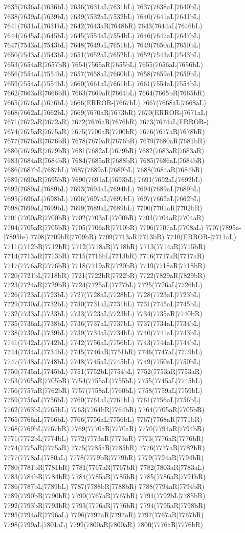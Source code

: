 7635(7636aL|7636bL) 7636(7631aL|7631bL) 7637(7638aL|7640bL) 7638(7639aL|7639bL) 7639(7532aL|7532bL) 7640(7641aL|7641bL) 7641(7631aL|7631bL) 7642(7643aR|7648bR) 7643(7644aL|7646bL) 7644(7645aL|7645bL) 7645(7554aL|7554bL) 7646(7647aL|7647bL) 7647(7543aL|7543bL) 7648(7649aL|7651bL) 7649(7650aL|7650bL) 7650(7543aL|7543bL) 7651(7652aL|7652bL) 7652(7543aL|7543bL) 7653(7654aR|7657bR) 7654(7565aR|7655bL) 7655(7656aL|7656bL) 7656(7554aL|7554bL) 7657(7658aL|7660bL) 7658(7659aL|7659bL) 7659(7554aL|7554bL) 7660(7661aL|7661bL) 7661(7554aL|7554bL) 7662(7663aR|7666bR) 7663(7669aR|7664bL) 7664(7665bR|7665bR) 7665(7676aL|7676bL) 7666(ERROR-|7667bL) 7667(7668aL|7668aL) 7668(7662aL|7662bL) 7669(7670aR|7673bR) 7670(ERROR-|7671aL) 7671(7672aR|7672aR) 7672(7676aR|7676bR) 7673(7674aL|ERROR-) 7674(7675aR|7675aR) 7675(7700aR|7700bR) 7676(7677aR|7678bR) 7677(7676aR|7676bR) 7678(7679aR|7676bR) 7679(7680aR|7681bR) 7680(7679aR|7679bR) 7681(7682aL|7679bR) 7682(7683aR|7683aR) 7683(7684aR|7684bR) 7684(7685aR|7688bR) 7685(7686aL|7684bR) 7686(7687bL|7687bL) 7687(7689aL|7689bL) 7688(7684aR|7684bR) 7689(7690aR|7695bR) 7690(7691aL|7693bL) 7691(7692aL|7692bL) 7692(7689aL|7689bL) 7693(7694aL|7694bL) 7694(7689aL|7689bL) 7695(7696aL|7698bL) 7696(7697aL|7697bL) 7697(7662aL|7662bL) 7698(7699aL|7699bL) 7699(7689aL|7689bL) 7700(7701aR|7702bR) 7701(7700aR|7700bR) 7702(7703aL|7700bR) 7703(7704aR|7704aR) 7704(7705aR|7705bR) 7705(7706aR|7710bR) 7706(7707aL|7708aL) 7707(7895a-|7895b-) 7708(7709bR|7709bR) 7709(7713aR|7713bR) 7710(ERROR-|7711aL) 7711(7712bR|7712bR) 7712(7718aR|7718bR) 7713(7714aR|7715bR) 7714(7713aR|7713bR) 7715(7716bL|7713bR) 7716(7717aR|7717aR) 7717(7776aR|7776bR) 7718(7719aR|7720bR) 7719(7718aR|7718bR) 7720(7721bL|7718bR) 7721(7722bR|7722bR) 7722(7829aR|7829bR) 7723(7724aR|7729bR) 7724(7725aL|7727bL) 7725(7726aL|7726bL) 7726(7723aL|7723bL) 7727(7728aL|7728bL) 7728(7723aL|7723bL) 7729(7730aL|7732bL) 7730(7731aL|7731bL) 7731(7745aL|7745bL) 7732(7733aL|7733bL) 7733(7723aL|7723bL) 7734(7735aR|7740bR) 7735(7736aL|7738bL) 7736(7737aL|7737bL) 7737(7734aL|7734bL) 7738(7739aL|7739bL) 7739(7734aL|7734bL) 7740(7741aL|7743bL) 7741(7742aL|7742bL) 7742(7756aL|7756bL) 7743(7744aL|7744bL) 7744(7734aL|7734bL) 7745(7746aR|7751bR) 7746(7747aL|7749bL) 7747(7748aL|7748bL) 7748(7745aL|7745bL) 7749(7750aL|7750bL) 7750(7745aL|7745bL) 7751(7752bL|7754bL) 7752(7753aR|7753aR) 7753(7705aR|7705bR) 7754(7755aL|7755bL) 7755(7745aL|7745bL) 7756(7757aR|7762bR) 7757(7758aL|7760bL) 7758(7759aL|7759bL) 7759(7756aL|7756bL) 7760(7761aL|7761bL) 7761(7756aL|7756bL) 7762(7763bL|7765bL) 7763(7764bR|7764bR) 7764(7705aR|7705bR) 7765(7766aL|7766bL) 7766(7756aL|7756bL) 7767(7768aR|7771bR) 7768(7769bL|7767bR) 7769(7770aR|7770aR) 7770(7794aR|7794bR) 7771(7772bL|7774bL) 7772(7773aR|7773aR) 7773(7776aR|7776bR) 7774(7775aR|7775aR) 7775(7785aR|7785bR) 7776(7777aR|7782bR) 7777(7778aL|7780aL) 7778(7779bR|7779bR) 7779(7794aR|7794bR) 7780(7781bR|7781bR) 7781(7767aR|7767bR) 7782(7803aR|7783aL) 7783(7784bR|7784bR) 7784(7785aR|7785bR) 7785(7786aR|7791bR) 7786(7787bL|7789bL) 7787(7788bR|7788bR) 7788(7794aR|7794bR) 7789(7790bR|7790bR) 7790(7767aR|7767bR) 7791(7792bL|7785bR) 7792(7793bR|7793bR) 7793(7776aR|7776bR) 7794(7795aR|7798bR) 7795(7794aR|7796aL) 7796(7797aR|7797aR) 7797(7767aR|7767bR) 7798(7799aL|7801aL) 7799(7800aR|7800aR) 7800(7776aR|7776bR) 